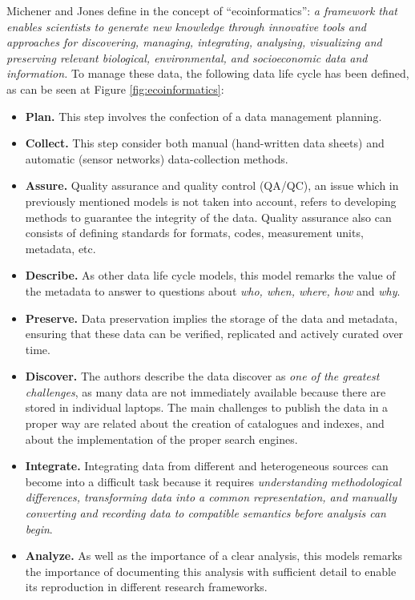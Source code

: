 Michener and Jones define in \cite{michener_ecoinformatics:_2012} the concept of ``ecoinformatics'': \textit{a framework that enables scientists to generate new knowledge through innovative tools and approaches for discovering, managing, integrating, analysing, visualizing and preserving relevant biological, environmental, and socioeconomic data and information.} To manage these data, the following data life cycle has been defined, as can be seen at Figure \ref{fig:ecoinformatics}:
\begin{itemize}
    \item \textbf{Plan.} This step involves the confection of a data management planning.
    \item \textbf{Collect.} This step consider both manual (hand-written data sheets) and automatic (sensor networks) data-collection methods.
    \item \textbf{Assure.} Quality assurance and quality control (QA/QC), an issue which in previously mentioned models is not taken into account, refers to developing methods to guarantee the integrity of the data. Quality assurance also can consists of defining standards for formats, codes, measurement units, metadata, etc.
    \item \textbf{Describe.} As other data life cycle models, this model remarks the value of the metadata to answer to questions about \textit{who, when, where, how} and \textit{why}.
    \item \textbf{Preserve.} Data preservation implies the storage of the data and metadata, ensuring that these data can be verified, replicated and actively curated over time.
    \item \textbf{Discover.} The authors describe the data discover as \textit{one of the greatest challenges}, as many data are not immediately available because there are stored in individual laptops. The main challenges to publish the data in a proper way are related about the creation of catalogues and indexes, and about the implementation of the proper search engines.
    \item \textbf{Integrate.} Integrating data from different and heterogeneous sources can become into a difficult task because it requires \textit{understanding methodological differences, transforming data into a common representation, and manually converting and recording data to compatible semantics before analysis can begin}.
    \item \textbf{Analyze.} As well as the importance of a clear analysis, this models remarks the importance of documenting this analysis with sufficient detail to enable its reproduction in different research frameworks.
\end{itemize}

